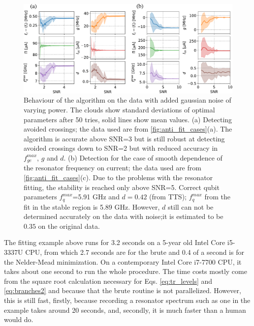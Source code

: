 \documentclass[%
 aip,
 amsmath,amssymb,
 reprint,%
]{revtex4-1}
\begin{document}
\begin{figure}
	\centering
	\includegraphics[width=.6\linewidth]{noise_test}
	\caption{Behaviour of the algorithm on the data with added gaussian noise of varying power. The clouds show standard deviations of optimal parameters after 50 tries, solid lines show mean values. (a) Detecting avoided crossings; the data used are from \autoref{fig:anti_fit_cases}(a). The algorithm is accurate above SNR=3 but is still robust at detecting avoided crossings down to SNR=2 but with reduced accuracy in $f_{ge}^{max}$, $g$ and $d$. (b) Detection for the case of smooth dependence of the resonator frequency on current; the data used are from \autoref{fig:anti_fit_cases}(c). Due to the problems with the resonator fitting, the stability is reached only above SNR=5. Correct qubit parameters $f_{q}^{max}$=5.91 GHz and $d=0.42$ (from TTS); $f_{q}^{max}$ from the fit in the stable region is 5.89 GHz. However, $d$ still can not be determined accurately on the data with noise;it is estimated to be $0.35$ on the original data.}
	\label{fig:noise_test}
\end{figure}
The fitting example above runs for 3.2 seconds on a 5-year old Intel Core i5-3337U CPU, from which 2.7 seconds are for the brute and 0.4 of a second is for the Nelder-Mead minimization. On a contemporary Intel Core i7-7700 CPU, it takes about one second to run the whole procedure. The time costs mostly come from the square root calculation necessary for Eqs. \eqref{eq:tr_levels} and \eqref{eq:branches2} and because that the brute routine is not parallelized. However, this is still fast, firstly, because recording a resonator spectrum such as one in the example takes around 20 seconds, and, secondly, it is much faster than a human would do. 
\end{document}
